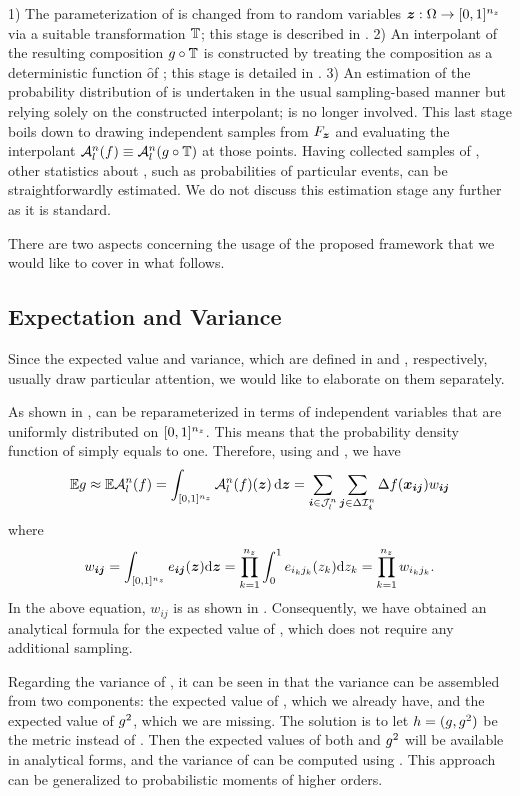 1) The parameterization of \g is changed from \vu to random variables $\boldsymbol{z}:
\Omega \to [0, 1]^{n_{z}}$ via a suitable transformation $\transform$; this stage is
described in . 2) An interpolant of the resulting composition
$\g \circ \transform$ is constructed by treating the composition as a
deterministic function \f of \vz; this stage is detailed in
. 3) An estimation of the probability distribution of \g is
undertaken in the usual sampling-based manner but relying solely on the
constructed interpolant; \g is no longer involved. This last stage boils down to
drawing independent samples from $F_{\boldsymbol{z}}$ and evaluating the interpolant
$\interpolant{n}{l}(\f) \equiv \interpolant{n}{l}(\g \circ \transform)$ at those
points. Having collected samples of \g, other statistics about \g, such as
probabilities of particular events, can be straightforwardly estimated. We do
not discuss this estimation stage any further as it is standard.

There are two aspects concerning the usage of the proposed framework that we
would like to cover in what follows.

\subsection{Expectation and Variance}

Since the expected value and variance, which are defined in 
and , respectively, usually draw particular attention, we would
like to elaborate on them separately.

As shown in , \g can be reparameterized in terms of independent
variables that are uniformly distributed on $[0, 1]^{n_{z}}$. This means that the
probability density function of \vz simply equals to one. Therefore, using
 and , we have
\[
  \expectation{\g} \approx \expectation{\interpolant{n}{l}(\f)} = \int_{[0, 1]^\nz} \interpolant{n}{l}(\f)(\vz) \, \d\vz = \sum_{\vi \in \sparseindex{n}{l}} \sum_{\vj \in \Delta\tensorindex{n}{\vi}} \Delta\f(\vx_{\vi \vj}) w_{\vi \vj}
\]
where
\[
  w_{\boldsymbol{i} \boldsymbol{j}} = \int_{[0, 1]^{n_{z}}} e_{\boldsymbol{i} \boldsymbol{j}}(\boldsymbol{z}) \mathrm{d}\boldsymbol{z} = \prod_{k = 1}^{n_{z}} \int_0^1 e_{i_k j_k}(z_k) \mathrm{d}z_k = \prod_{k = 1}^{n_{z}} w_{i_k j_k}.
\]
In the above equation, $w_{ij}$ is as shown in . Consequently, we
have obtained an analytical formula for the expected value of \g, which does not
require any additional sampling.

Regarding the variance of \g, it can be seen in  that the
variance can be assembled from two components: the expected value of \g, which
we already have, and the expected value of $g^2$, which we are missing. The
solution is to let $h = (g, g^2)$ be the metric instead of \g. Then the
expected values of both \g and $g^2$ will be available in analytical forms, and
the variance of \g can be computed using . This approach can be
generalized to probabilistic moments of higher orders.

